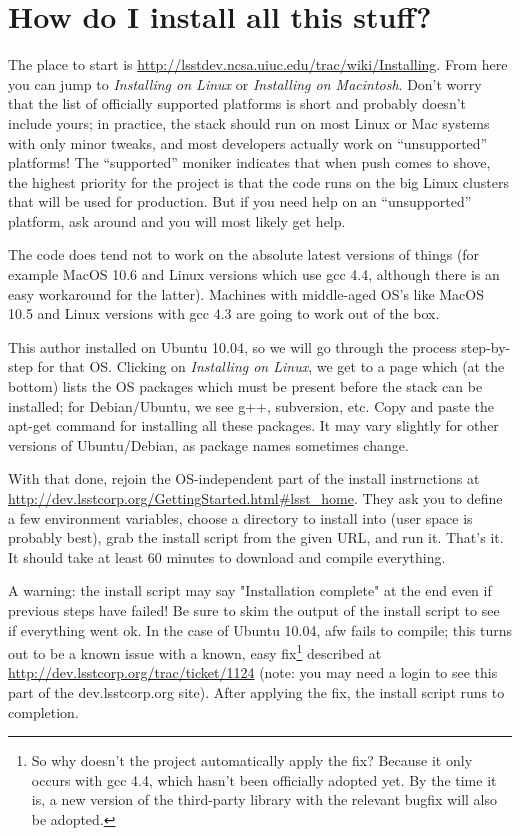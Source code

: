 
\section{How do I install all this stuff?}

The place to start is
\url{http://lsstdev.ncsa.uiuc.edu/trac/wiki/Installing}.  From here
you can jump to {\it Installing on Linux} or {\it Installing on
  Macintosh}.  Don't worry that the list of officially supported
platforms is short and probably doesn't include yours; in practice,
the stack should run on most Linux or Mac systems with only minor
tweaks, and most developers actually work on ``unsupported''
platforms!  The ``supported'' moniker indicates that when push comes
to shove, the highest priority for the project is that the code runs
on the big Linux clusters that will be used for production.  But if
you need help on an ``unsupported'' platform, ask around and you will
most likely get help.

The code does tend not to work on the absolute latest versions of
things (for example MacOS 10.6 and Linux versions which use gcc 4.4,
although there is an easy workaround for the latter).  Machines with
middle-aged OS's like MacOS 10.5 and Linux versions with gcc 4.3 are
going to work out of the box.

This author installed on Ubuntu 10.04, so we will go through the
process step-by-step for that OS.  Clicking on {\it Installing on
  Linux}, we get to a page which (at the bottom) lists the OS packages
which must be present before the stack can be installed; for
Debian/Ubuntu, we see g++, subversion, etc.  Copy and paste the
apt-get command for installing all these packages. It may vary
slightly for other versions of Ubuntu/Debian, as package names
sometimes change.

With that done, rejoin the OS-independent part of the install
instructions at
\url{http://dev.lsstcorp.org/GettingStarted.html#lsst_home}.  They ask
you to define a few environment variables, choose a directory to
install into (user space is probably best), grab the install script
from the given URL, and run it.  That's it.  It should take at least
60 minutes to download and compile everything. 

A warning: the install script may say "Installation complete" at the
end even if previous steps have failed!  Be sure to skim the output of
the install script to see if everything went ok.  In the case of
Ubuntu 10.04, afw fails to compile; this turns out to be a known issue
with a known, easy fix\footnote{So why doesn't the project
  automatically apply the fix?  Because it only occurs with gcc 4.4,
  which hasn't been officially adopted yet. By the time it is, a new
  version of the third-party library with the relevant bugfix will
  also be adopted.} described at
\url{http://dev.lsstcorp.org/trac/ticket/1124} (note: you may need a
login to see this part of the dev.lsstcorp.org site).  After applying
the fix, the install script runs to completion.

